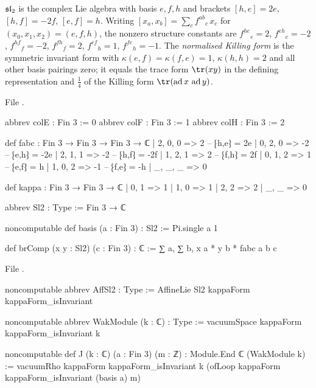 \begin{definition}\label{l08:def:sl2}
$\mathfrak{sl}_2$ is the complex Lie algebra with basis $e,f,h$ and brackets $[h,e]=2e$, $[h,f]=-2f$,
$[e,f]=h$. Writing $[x_a,x_b] = \sum_c f^{ab}{}_c\,x_c$ for $(x_0,x_1,x_2) = (e,f,h)$, the nonzero
structure constants are $f^{he}{}_e = 2$, $f^{eh}{}_e=-2$, $f^{hf}{}_f=-2$, $f^{fh}{}_f=2$,
$f^{ef}{}_h=1$, $f^{fe}{}_h=-1$. The \emph{normalised Killing form} is the symmetric invariant form with
$\kappa(e,f)=\kappa(f,e)=1$, $\kappa(h,h)=2$ and all other basis pairings zero; it equals the trace
form $\tr(xy)$ in the defining representation and $\frac14$ of the Killing form
$\tr(\leightad x\,\leightad y)$.
\end{definition}

\noindent File .
\begin{leancode}
abbrev colE : Fin 3 := 0
abbrev colF : Fin 3 := 1
abbrev colH : Fin 3 := 2

def fabc : Fin 3 → Fin 3 → Fin 3 → ℂ
  | 2, 0, 0 => 2    -- ⁅h,e⁆ = 2e
  | 0, 2, 0 => -2   -- ⁅e,h⁆ = -2e
  | 2, 1, 1 => -2   -- ⁅h,f⁆ = -2f
  | 1, 2, 1 => 2    -- ⁅f,h⁆ = 2f
  | 0, 1, 2 => 1    -- ⁅e,f⁆ = h
  | 1, 0, 2 => -1   -- ⁅f,e⁆ = -h
  | _, _, _ => 0

def kappa : Fin 3 → Fin 3 → ℂ
  | 0, 1 => 1
  | 1, 0 => 1
  | 2, 2 => 2
  | _, _ => 0

abbrev Sl2 : Type := Fin 3 → ℂ

noncomputable def basis (a : Fin 3) : Sl2 := Pi.single a 1

def brComp (x y : Sl2) (c : Fin 3) : ℂ := ∑ a, ∑ b, x a * y b * fabc a b c
\end{leancode}
\noindent File .
\begin{leancode}
noncomputable abbrev AffSl2 : Type := AffineLie Sl2 kappaForm kappaForm_isInvariant

noncomputable abbrev WakModule (k : ℂ) : Type :=
  vacuumSpace kappaForm kappaForm_isInvariant k

noncomputable def J (k : ℂ) (a : Fin 3) (m : ℤ) : Module.End ℂ (WakModule k) :=
  vacuumRho kappaForm kappaForm_isInvariant k (ofLoop kappaForm kappaForm_isInvariant (basis a) m)
\end{leancode}

